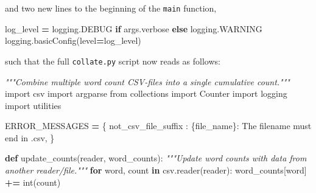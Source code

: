 \documentclass[
]{krantz}
\makeatletter
\newenvironment{Shaded}{\begin{snugshade}}{\end{snugshade}}
\newcommand{\BuiltInTok}[1]{#1}
\newcommand{\CommentTok}[1]{\textcolor[rgb]{0.56,0.35,0.01}{\textit{#1}}}
\newcommand{\ControlFlowTok}[1]{\textcolor[rgb]{0.13,0.29,0.53}{\textbf{#1}}}
\newcommand{\ImportTok}[1]{#1}
\newcommand{\KeywordTok}[1]{\textcolor[rgb]{0.13,0.29,0.53}{\textbf{#1}}}
\newcommand{\NormalTok}[1]{#1}
\newcommand{\OperatorTok}[1]{\textcolor[rgb]{0.81,0.36,0.00}{\textbf{#1}}}
\newcommand{\SpecialCharTok}[1]{\textcolor[rgb]{0.00,0.00,0.00}{#1}}
\newcommand{\StringTok}[1]{\textcolor[rgb]{0.31,0.60,0.02}{#1}}
\newenvironment{kframe}{%
\medskip{}
\setlength{\fboxsep}{.8em}
 \def\at@end@of@kframe{}%
 \ifinner\ifhmode%
  \def\at@end@of@kframe{\end{minipage}}%
  \begin{minipage}{\columnwidth}%
 \fi\fi%
 \def\FrameCommand##1{\hskip\@totalleftmargin \hskip-\fboxsep
 \colorbox{shadecolor}{##1}\hskip-\fboxsep
     \hskip-\linewidth \hskip-\@totalleftmargin \hskip\columnwidth}%
 \MakeFramed {\advance\hsize-\width
   \@totalleftmargin\z@ \linewidth\hsize
   \@setminipage}}%
 {\par\unskip\endMakeFramed%
 \at@end@of@kframe}
\renewenvironment{Shaded}{\begin{kframe}}{\end{kframe}}
\makeatother
\begin{document}
and two new lines to the beginning of the \texttt{main} function,

\begin{Shaded}
\begin{Highlighting}[]
\NormalTok{log\_level }\OperatorTok{=}\NormalTok{ logging.DEBUG }\ControlFlowTok{if}\NormalTok{ args.verbose }\ControlFlowTok{else}\NormalTok{ logging.WARNING}
\NormalTok{logging.basicConfig(level}\OperatorTok{=}\NormalTok{log\_level)}
\end{Highlighting}
\end{Shaded}

such that the full \texttt{collate.py} script now reads as follows:

\begin{Shaded}
\begin{Highlighting}[]
\CommentTok{"""Combine multiple word count CSV{-}files into a single cumulative count."""}
\ImportTok{import}\NormalTok{ csv}
\ImportTok{import}\NormalTok{ argparse}
\ImportTok{from}\NormalTok{ collections }\ImportTok{import}\NormalTok{ Counter}
\ImportTok{import}\NormalTok{ logging}
\ImportTok{import}\NormalTok{ utilities}


\NormalTok{ERROR\_MESSAGES }\OperatorTok{=}\NormalTok{ \{}
    \StringTok{\textquotesingle{}not\_csv\_file\_suffix\textquotesingle{}}\NormalTok{ : }\StringTok{\textquotesingle{}}\SpecialCharTok{\{file\_name\}}\StringTok{: The filename must end in \textasciigrave{}.csv\textasciigrave{}\textquotesingle{}}\NormalTok{,}
\NormalTok{\}}

\KeywordTok{def}\NormalTok{ update\_counts(reader, word\_counts):}
    \CommentTok{"""Update word counts with data from another reader/file."""}
    \ControlFlowTok{for}\NormalTok{ word, count }\KeywordTok{in}\NormalTok{ csv.reader(reader):}
\NormalTok{        word\_counts[word] }\OperatorTok{+=} \BuiltInTok{int}\NormalTok{(count)}


\end{Highlighting}
\end{Shaded}
\end{document}
